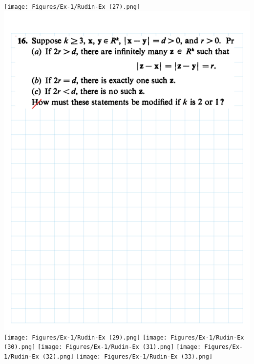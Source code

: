 \documentclass[
]{book}
\theoremstyle{definition}
\theoremstyle{definition}
\theoremstyle{definition}
\theoremstyle{definition}
\theoremstyle{remark}
\begin{document}
\texttt{[image: Figures/Ex-1/Rudin-Ex (27).png]}
\includegraphics{Figures/Ex-1/Rudin-Ex (28).png}
\texttt{[image: Figures/Ex-1/Rudin-Ex (29).png]}
\texttt{[image: Figures/Ex-1/Rudin-Ex (30).png]}
\texttt{[image: Figures/Ex-1/Rudin-Ex (31).png]}
\texttt{[image: Figures/Ex-1/Rudin-Ex (32).png]}
\texttt{[image: Figures/Ex-1/Rudin-Ex (33).png]}
\end{document}
